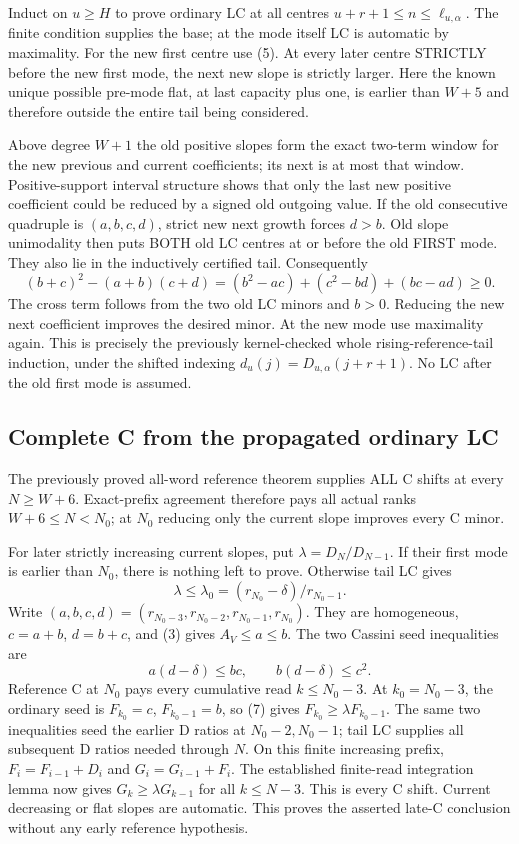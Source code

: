 Induct on $u\ge H$ to prove ordinary LC at all centres
$u+r+1\le n\le\ell_{u,\alpha}$.
The finite condition supplies the base; at the mode itself LC is
automatic by maximality. For the new first centre use (5).
At every later centre STRICTLY before the new first mode, the next
new slope is strictly larger. Here the known unique possible pre-mode
flat, at last capacity plus one, is earlier than $W+5$ and therefore
outside the entire tail being considered.

Above degree $W+1$ the old positive slopes form the exact two-term
window for the new previous and current coefficients; its next is
at most that window. Positive-support interval structure shows that
only the last new positive coefficient could be reduced by a signed
old outgoing value. If the old consecutive quadruple is $(a,b,c,d)$,
strict new next growth forces $d>b$. Old slope unimodality then
puts BOTH old LC centres at or before the old FIRST mode. They also
lie in the inductively certified tail. Consequently
\[
 (b+c)^2-(a+b)(c+d)
  =(b^2-ac)+(c^2-bd)+(bc-ad)\ge0.                       \tag{6}
\]
The cross term follows from the two old LC minors and $b>0$.
Reducing the new next coefficient improves the desired minor.
At the new mode use maximality again. This is precisely the
previously kernel-checked whole rising-reference-tail induction,
under the shifted indexing $d_u(j)=D_{u,\alpha}(j+r+1)$.
No LC after the old first mode is assumed.

\subsection*{Complete C from the propagated ordinary LC}
The previously proved all-word reference theorem supplies ALL C
shifts at every $N\ge W+6$. Exact-prefix agreement therefore pays
all actual ranks $W+6\le N<N_0$; at $N_0$ reducing only the
current slope improves every C minor.

For later strictly increasing current slopes, put
$\lambda=D_N/D_{N-1}$. If their first mode is earlier than $N_0$,
there is nothing left to prove. Otherwise tail LC gives
\[
           \lambda\le\lambda_0=(r_{N_0}-\delta)/r_{N_0-1}.
\]
Write $(a,b,c,d)=(r_{N_0-3},r_{N_0-2},r_{N_0-1},r_{N_0})$.
They are homogeneous, $c=a+b$, $d=b+c$, and (3) gives
$A_V\le a\le b$. The two Cassini seed inequalities are
\[
                 a(d-\delta)\le bc,\qquad
                 b(d-\delta)\le c^2.                  \tag{7}
\]
Reference C at $N_0$ pays every cumulative read $k\le N_0-3$.
At $k_0=N_0-3$, the ordinary seed is
$F_{k_0}=c$, $F_{k_0-1}=b$, so (7) gives
$F_{k_0}\ge\lambda F_{k_0-1}$.
The same two inequalities seed the earlier D ratios at
$N_0-2,N_0-1$; tail LC supplies all subsequent D ratios needed
through $N$. On this finite increasing prefix,
$F_i=F_{i-1}+D_i$ and $G_i=G_{i-1}+F_i$.
The established finite-read integration lemma now gives
$G_k\ge\lambda G_{k-1}$ for all $k\le N-3$.
This is every C shift. Current decreasing or flat slopes are
automatic. This proves the asserted late-C conclusion without any
early reference hypothesis.

